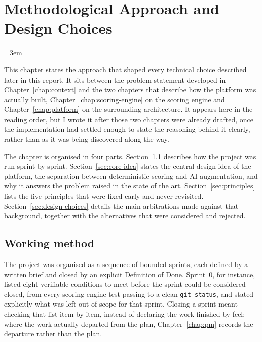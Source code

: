\chapter{Methodological Approach and Design Choices}
\label{chap:method}
\emergencystretch=3em\relax

This chapter states the approach that shaped every technical choice
described later in this report. It sits between the problem statement
developed in Chapter~\ref{chap:context} and the two chapters that describe
how the platform was actually built, Chapter~\ref{chap:scoring-engine} on
the scoring engine and Chapter~\ref{chap:platform} on the surrounding
architecture. It appears here in the reading order, but I wrote it after
those two chapters were already drafted, once the implementation had
settled enough to state the reasoning behind it clearly, rather than as it
was being discovered along the way.

The chapter is organised in four parts. Section~\ref{sec:working-method}
describes how the project was run sprint by sprint. Section~\ref{sec:core-idea}
states the central design idea of the platform, the separation between
deterministic scoring and AI augmentation, and why it answers the problem
raised in the state of the art. Section~\ref{sec:principles} lists the five
principles that were fixed early and never revisited. Section~\ref{sec:design-choices}
details the main arbitrations made against that background, together with
the alternatives that were considered and rejected.

\section{Working method}
\label{sec:working-method}

The project was organised as a sequence of bounded sprints, each defined by
a written brief and closed by an explicit Definition of Done. Sprint~0, for
instance, listed eight verifiable conditions to meet before the sprint
could be considered closed, from every scoring engine test passing to a
clean \texttt{git status}, and stated explicitly what was left out of scope
for that sprint. Closing a sprint meant checking that list item by item,
instead of declaring the work finished by feel; where the work actually
departed from the plan, Chapter~\ref{chap:pm} records the departure rather
than the plan.

